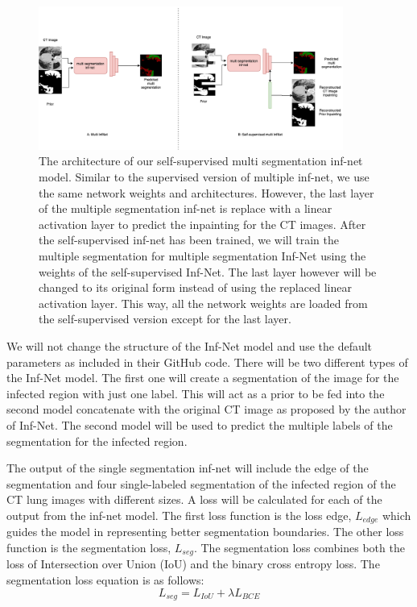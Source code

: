 \begin{figure}
	\centering
	\includegraphics[width=100mm]{self-super-multi-inf-net.png}
	\caption{The architecture of our self-supervised multi segmentation inf-net model. Similar to the supervised version of multiple inf-net, we use the same network weights and architectures. However, the last layer of the multiple segmentation inf-net is replace with a linear activation layer to predict the inpainting for the CT images. After the self-supervised inf-net has been trained, we will train the multiple segmentation for multiple segmentation Inf-Net using the weights of the self-supervised Inf-Net.  The last layer however will be changed to its original form instead of using the replaced linear activation layer.  This way, all the network weights are loaded from the self-supervised version except for the last layer.}
\end{figure}

We will not change the structure of the Inf-Net model and use the default parameters as included in their GitHub code. There will be two different types of the Inf-Net model. The first one will create a segmentation of the image for the infected region with just one label. This will act as a prior to be fed into the second model concatenate with the original CT image as proposed by the author of Inf-Net. The second model will be used to predict the multiple labels of the segmentation for the infected region.

The output of the single segmentation inf-net will include the edge of the segmentation and four single-labeled segmentation of the infected region of the CT lung images with different sizes. A loss will be calculated for each of the output from the inf-net model. The first loss function is the loss edge, $L_{edge}$ which guides the model in representing better segmentation boundaries. The other loss function is the segmentation loss, ${L_{seg}}$. The segmentation loss combines both the loss of Intersection over Union (IoU) and the binary cross entropy loss. The segmentation loss equation is as follows:
\begin{equation}
L_{seg} = L_{IoU} + \lambda L_{BCE}
\end{equation}

